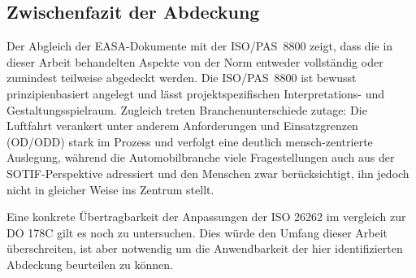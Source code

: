 \subsection{Zwischenfazit der Abdeckung}
Der Abgleich der EASA-Dokumente mit der ISO/PAS~8800 zeigt, dass die in dieser Arbeit behandelten Aspekte von der Norm
entweder vollständig oder zumindest teilweise abgedeckt werden. Die ISO/PAS~8800 ist bewusst
prinzipienbasiert angelegt und lässt projektspezifischen Interpretations- und Gestaltungsspielraum. Zugleich treten
Branchenunterschiede zutage: Die Luftfahrt verankert unter anderem Anforderungen und Einsatzgrenzen (OD/ODD) stark im
Prozess und verfolgt eine deutlich mensch-zentrierte Auslegung, während die Automobilbranche viele Fragestellungen auch
aus der SOTIF-Perspektive adressiert und den Menschen zwar berücksichtigt, ihn jedoch nicht in gleicher Weise ins Zentrum
stellt.

Eine konkrete Übertragbarkeit der Anpassungen der ISO 26262 im vergleich zur DO 178C gilt es noch zu untersuchen. 
Dies würde den Umfang dieser Arbeit überschreiten, ist aber notwendig um die Anwendbarkeit der hier identifizierten 
Abdeckung beurteilen zu können.